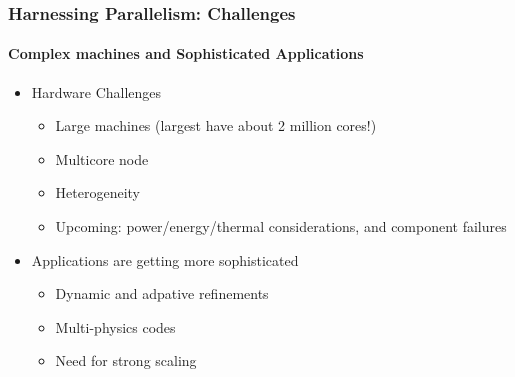 \begin{frame}[t]
\frametitle{Harnessing Parallelism: Challenges}
\framesubtitle{Complex machines and Sophisticated Applications}
\begin{itemize}
\item Hardware Challenges
  \begin{itemize}
    \item Large machines (largest have about 2 million cores!)
    \item Multicore node
    \item Heterogeneity
    \item Upcoming: power/energy/thermal considerations, and component failures
  \end{itemize}
\item{Applications are getting more sophisticated}
  \begin{itemize}
    \item Dynamic and adpative refinements
    \item Multi-physics codes
    \item Need for strong scaling
  \end{itemize}
\end{itemize}
\end{frame}



%     


%     

